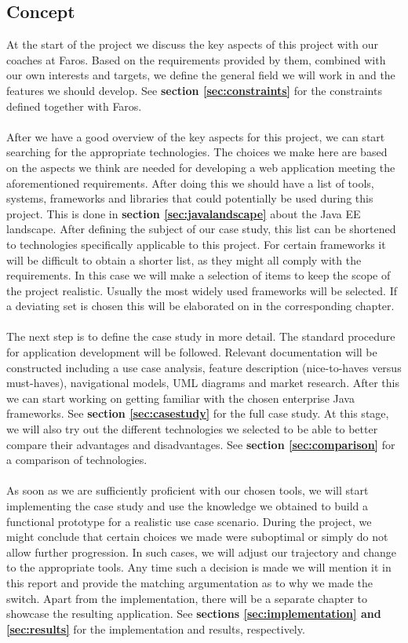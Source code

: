 \documentclass[12pt]{article}
\begin{document}
\begin{multicols}{2}
\subsection{Concept}\label{sec:concept}
At the start of the project we discuss the key aspects of this project with our coaches at Faros. Based on the requirements provided by them, combined with our own interests and targets, we define the general field we will work in and the features we should develop. See \textbf{section \ref{sec:constraints}} for the constraints defined together with Faros.
\\\\
After we have a good overview of the key aspects for this project, we can start searching for the appropriate technologies. The choices we make here are based on the aspects we think are needed for developing a web application meeting the aforementioned requirements. After doing this we should have a list of tools, systems, frameworks and libraries that could potentially be used during this project. This is done in \textbf{section \ref{sec:javalandscape}} about the Java EE landscape. After defining the subject of our case study, this list can be shortened to technologies specifically applicable to this project. For certain frameworks it will be difficult to obtain a shorter list, as they might all comply with the requirements. In this case we will make a selection of items to keep the scope of the project realistic. Usually the most widely used frameworks will be selected. If a deviating set is chosen this will be elaborated on in the corresponding chapter. 
\\\\
The next step is to define the case study in more detail. The standard procedure for application development will be followed. Relevant documentation will be constructed including a use case analysis, feature description (nice-to-haves versus must-haves), navigational models, UML diagrams and market research. After this we can start working on getting familiar with the chosen enterprise Java frameworks. See \textbf{section \ref{sec:casestudy}} for the full case study. At this stage, we will also try out the different technologies we selected to be able to better compare their advantages and disadvantages. See \textbf{section \ref{sec:comparison}} for a comparison of technologies.
\\\\
As soon as we are sufficiently proficient with our chosen tools, we will start implementing the case study and use the knowledge we obtained to build a functional prototype for a realistic use case scenario. During the project, we might conclude that certain choices we made were suboptimal or simply do not allow further progression. In such cases, we will adjust our trajectory and change to the appropriate tools. Any time such a decision is made we will mention it in this report and provide the matching argumentation as to why we made the switch. Apart from the implementation, there will be a separate chapter to showcase the resulting application. See \textbf{sections \ref{sec:implementation} and \ref{sec:results}} for the implementation and results, respectively.

\end{multicols}
\end{document}
